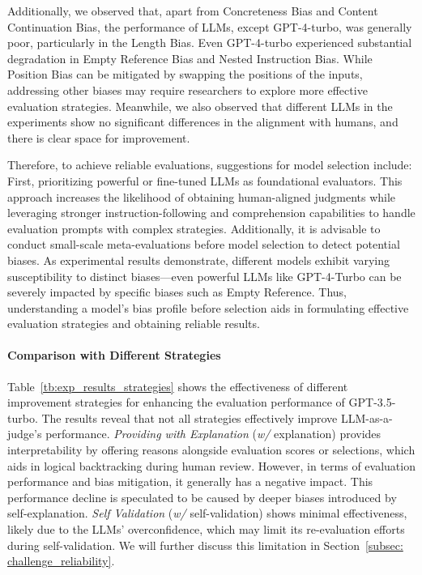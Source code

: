 Additionally, we observed that, apart from Concreteness Bias and Content Continuation Bias, the performance of LLMs, except GPT-4-turbo, was generally poor, particularly in the Length Bias. 
Even GPT-4-turbo experienced substantial degradation in Empty Reference Bias and Nested Instruction Bias. 
While Position Bias can be mitigated by swapping the positions of the inputs, addressing other biases may require researchers to explore more effective evaluation strategies. 
Meanwhile, we also observed that different LLMs in the experiments show no significant differences in the alignment with humans, and there is clear space for improvement.

Therefore, to achieve reliable evaluations, suggestions for model selection include: First, prioritizing powerful or fine-tuned LLMs as foundational evaluators. This approach increases the likelihood of obtaining human-aligned judgments while leveraging stronger instruction-following and comprehension capabilities to handle evaluation prompts with complex strategies. Additionally, it is advisable to conduct small-scale meta-evaluations before model selection to detect potential biases. As experimental results demonstrate, different models exhibit varying susceptibility to distinct biases—even powerful LLMs like GPT-4-Turbo can be severely impacted by specific biases such as Empty Reference. Thus, understanding a model's bias profile before selection aids in formulating effective evaluation strategies and obtaining reliable results.


\paragraph{\textbf{Comparison with Different Strategies}}
Table~\ref{tb:exp_results_strategies} shows the effectiveness of different improvement strategies for enhancing the evaluation performance of GPT-3.5-turbo. 
The results reveal that not all strategies effectively improve LLM-as-a-judge's performance. 
\textit{Providing with Explanation} (\textit{w/} explanation) provides interpretability by offering reasons alongside evaluation scores or selections, which aids in logical backtracking during human review. However, in terms of evaluation performance and bias mitigation, it generally has a negative impact. This performance decline is speculated to be caused by deeper biases introduced by self-explanation. \textit{Self Validation} (\textit{w/} self-validation) shows minimal effectiveness, likely due to the LLMs' overconfidence, which may limit its re-evaluation efforts during self-validation. We will further discuss this limitation in Section~\ref{subsec: challenge_reliability}.

